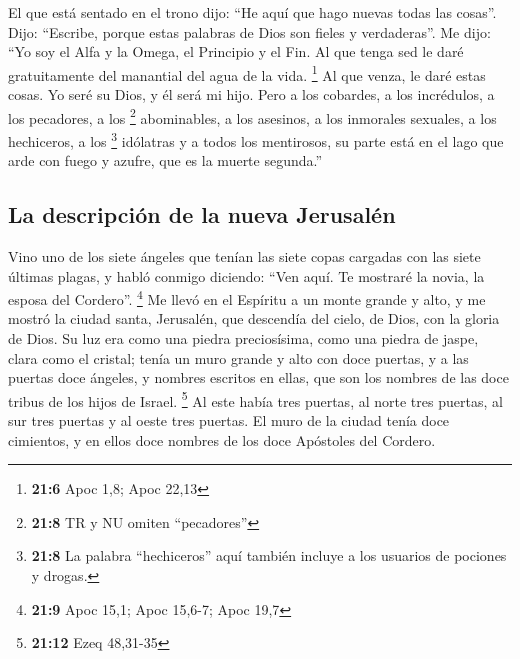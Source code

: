  El que está sentado en el trono dijo: ``He aquí que hago
nuevas todas las cosas''. Dijo: ``Escribe, porque estas palabras de Dios
son fieles y verdaderas''.  Me dijo: ``Yo soy el Alfa y la
Omega, el Principio y el Fin. Al que tenga sed le daré gratuitamente del
manantial del agua de la vida. \footnote{\textbf{21:6} Apoc 1,8; Apoc
  22,13}  Al que venza, le daré estas cosas. Yo seré su
Dios, y él será mi hijo.  Pero a los cobardes, a los
incrédulos, a los pecadores, a los \footnote{\textbf{21:8} TR y NU
  omiten ``pecadores''} abominables, a los asesinos, a los inmorales
sexuales, a los hechiceros, a los \footnote{\textbf{21:8} La palabra
  ``hechiceros'' aquí también incluye a los usuarios de pociones y
  drogas.} idólatras y a todos los mentirosos, su parte está en el lago
que arde con fuego y azufre, que es la muerte segunda.''

\hypertarget{la-descripciuxf3n-de-la-nueva-jerusaluxe9n}{%
\subsection{La descripción de la nueva
Jerusalén}\label{la-descripciuxf3n-de-la-nueva-jerusaluxe9n}}

 Vino uno de los siete ángeles que tenían las siete copas
cargadas con las siete últimas plagas, y habló conmigo diciendo: ``Ven
aquí. Te mostraré la novia, la esposa del Cordero''. \footnote{\textbf{21:9}
  Apoc 15,1; Apoc 15,6-7; Apoc 19,7}  Me llevó en el
Espíritu a un monte grande y alto, y me mostró la ciudad santa,
Jerusalén, que descendía del cielo, de Dios,  con la
gloria de Dios. Su luz era como una piedra preciosísima, como una piedra
de jaspe, clara como el cristal;  tenía un muro grande y
alto con doce puertas, y a las puertas doce ángeles, y nombres escritos
en ellas, que son los nombres de las doce tribus de los hijos de Israel.
\footnote{\textbf{21:12} Ezeq 48,31-35}  Al este había
tres puertas, al norte tres puertas, al sur tres puertas y al oeste tres
puertas.  El muro de la ciudad tenía doce cimientos, y en
ellos doce nombres de los doce Apóstoles del Cordero.

